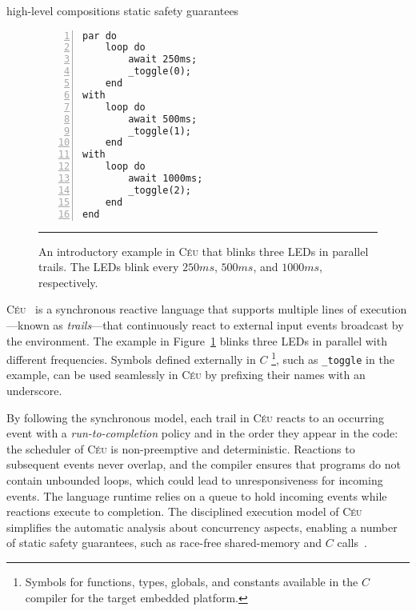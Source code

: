 \documentclass{sig-alternate-ipsn13}
\newcommand{\CEU}{\textsc{C\'{e}u}\xspace}
\newcommand{\code}[1] {{\small{\texttt{#1}}}}
\begin{document}
high-level compositions
static safety guarantees

\begin{comment}
- deterministic and bounded execution
- shared memory concurrency
- integration with C
- locals and finalization
- first-class timers
- internal events
\end{comment}

\begin{figure}[t]
\begin{lstlisting}[numbers=left,xleftmargin=3em]
par do
    loop do
        await 250ms;
        _toggle(0);
    end
with
    loop do
        await 500ms;
        _toggle(1);
    end
with
    loop do
        await 1000ms;
        _toggle(2);
    end
end
\end{lstlisting}
\rule{8.6cm}{0.37pt}
\caption{
    An introductory example in \CEU that blinks three LEDs in parallel trails.
    The LEDs blink every $250ms$, $500ms$, and $1000ms$, respectively.
    \label{lst.blink}
}
\end{figure}

\CEU~\cite{ceu.sensys13} is a synchronous reactive language that supports 
multiple lines of execution---known as \emph{trails}---that continuously react 
to external input events broadcast by the environment.
%
The example in Figure~\ref{lst.blink} blinks three LEDs in parallel with 
different frequencies.
%
Symbols defined externally in $C$%
\footnote{Symbols for functions, types, globals, and constants available in the 
$C$ compiler for the target embedded platform.
}, such as \code{\_toggle} in the example, can be used seamlessly in \CEU by 
prefixing their names with an underscore.

By following the synchronous model, each trail in \CEU reacts to an occurring 
event with a \emph{run-to-completion} policy and in the order they appear in 
the code: the scheduler of \CEU is non-preemptive and deterministic.
%
Reactions to subsequent events never overlap, and the compiler ensures that 
programs do not contain unbounded loops, which could lead to unresponsiveness 
for incoming events.
%
The language runtime relies on a queue to hold incoming events while reactions 
execute to completion.
%
The disciplined execution model of \CEU simplifies the automatic analysis about 
concurrency aspects, enabling a number of static safety guarantees, such as 
race-free shared-memory and $C$ calls~\cite{ceu.sensys13}.
%
\end{document}
